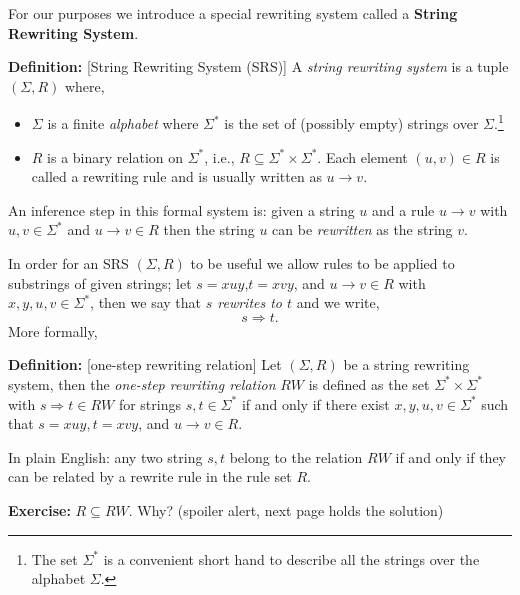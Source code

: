 \documentclass[a4paper,blends,pdf,colorBG,slideColor]{prosper}
\begin{document}
For our purposes we introduce a special rewriting system called a {\bf String Rewriting System}.
\es



\vspace{.1in}
{\bf Definition:} [String Rewriting System (SRS)]  A {\em string rewriting system} is a tuple $(\Sigma,R)$ where,
\begin{itemize}
\item $\Sigma$ is a finite {\em alphabet} where $\Sigma^*$ is the set of (possibly empty) strings over $\Sigma$.\footnote{The set $\Sigma^*$ is a convenient short hand to describe all the strings over the alphabet $\Sigma$.}
\item $R$ is a binary relation on $\Sigma^*$, i.e., $R\subseteq \Sigma^*\times\Sigma^*$. Each element  
$(u,v)\in R$ is called a rewriting rule and is usually written as $u \rightarrow v$.
\end{itemize}

\vspace{.1in}
An inference step in this formal system is: given a string $u$ and a rule $u \rightarrow v$ with $u,v \in \Sigma^*$ and
$u \rightarrow v \in R$ then the string $u$ can be {\em rewritten} as the string $v$.

\vspace{1in}
\es



\small
In order for an SRS $(\Sigma,R)$ to be useful we allow rules to be applied to substrings of given strings; let $s = xuy$,$t=xvy$, and $u\rightarrow v \in R$ with $x,y,u,v \in \Sigma^*$, then we say that {\em $s$ rewrites to $t$} and we write,
\[
s \Rightarrow t.
\]
More formally,

\vspace{.1in}
{\bf Definition:} [one-step rewriting relation] Let $(\Sigma,R)$ be a string rewriting system,
then the {\em one-step rewriting relation} $RW$ is defined as the set $\Sigma^*\times\Sigma^*$ with $s\Rightarrow t \in RW$ for strings $s,t \in\Sigma^*$
 if and only if there exist $x, y, u, v \in\Sigma^*$ such that $s = xuy, t = xvy$, and $u\rightarrow v \in R$.

\vspace{.1in}
In plain English: any two string $s,t$ belong to the relation $RW$ if and only if they can be related by 
a rewrite rule in the rule set $R$.

\vspace{.1in}
{\bf Exercise:} $R \subseteq RW$.  Why? (spoiler alert, next page holds the solution)
\es
\end{document}
